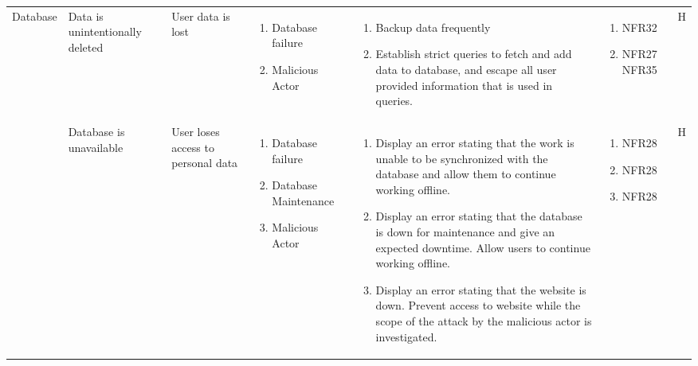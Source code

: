 \documentclass{article}
\begin{document}
\begin{longtable}{ | l | p{2.5cm} | p{3cm} | p{3cm} | p{3.5cm} | p{1.5cm} | c | }
			\multirow{3}{4em}{Database} & Data is unintentionally deleted  & User data is lost &
			\begin{enumerate}[leftmargin=*]
				\item Database failure
				\item Malicious Actor
			\end{enumerate} 
			& 
			\begin{enumerate}[leftmargin=*]
				\item Backup data frequently
				\item Establish strict queries to fetch and add data to database, and escape all user provided information that is used in queries.
			\end{enumerate} 
			& 
			\begin{enumerate}[leftmargin=*]
				\item NFR32
				\item NFR27 NFR35
			\end{enumerate}
			& H\newComponent-1 \\
			\cline{2-7}
			&  Database is unavailable & User loses access to personal data &
			\begin{enumerate}[leftmargin=*]
				\item Database failure
				\item Database Maintenance
				\item Malicious Actor
			\end{enumerate} 
			& 
			\begin{enumerate}[leftmargin=*]
				\item Display an error stating that the work is unable to be synchronized with the database and allow them to continue working offline.
				\item Display an error stating that the database is down for maintenance and give an expected downtime. Allow users to continue working offline.
				\item Display an error stating that the website is down. Prevent access to website while the scope of the attack by the malicious actor is investigated.
			\end{enumerate} 
			& 
			\begin{enumerate}[leftmargin=*]
				\item NFR28
				\item NFR28 
				\item NFR28
			\end{enumerate}
			& H\thecomponentNum-2 \\

\end{longtable}
\end{document}
